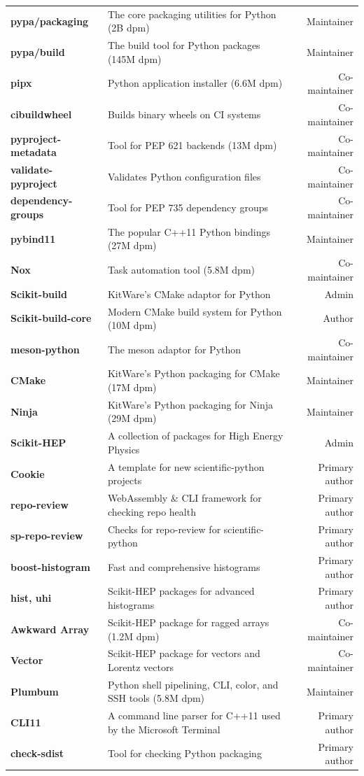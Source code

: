 \documentclass[10pt,letterpaper]{moderncv}
\begin{document}
\begin{tabularx}{\textwidth}{>{\bfseries}p{1.2in}Xr}
    pypa/packaging & The core packaging utilities for Python (2B dpm) & Maintainer \\
    pypa/build & The build tool for Python packages (145M dpm) & Maintainer \\
    pipx & Python application installer (6.6M dpm) & Co-maintainer \\
    cibuildwheel & Builds binary wheels on CI systems & Co-maintainer \\
    pyproject-metadata & Tool for PEP 621 backends (13M dpm) & Co-maintainer \\
    validate-pyproject & Validates Python configuration files & Co-maintainer \\
    dependency-groups & Tool for PEP 735 dependency groups & Co-maintainer \\
    pybind11 & The popular C++11 Python bindings (27M dpm) & Maintainer \\
    Nox & Task automation tool (5.8M dpm) & Co-maintainer \\
    Scikit-build & KitWare's CMake adaptor for Python & Admin \\
    Scikit-build-core & Modern CMake build system for Python (10M dpm) & Author \\
    meson-python & The meson adaptor for Python & Co-maintainer \\
    CMake & KitWare's Python packaging for CMake (17M dpm) & Maintainer \\
    Ninja & KitWare's Python packaging for Ninja (29M dpm) & Maintainer \\
    Scikit-HEP & A collection of packages for High Energy Physics & Admin \\
    Cookie & A template for new scientific-python projects & Primary author \\
    repo-review & WebAssembly \& CLI framework for checking repo health & Primary author \\
    sp-repo-review & Checks for repo-review for scientific-python & Primary author \\
    boost-histogram & Fast and comprehensive histograms & Primary author \\
    hist, uhi & Scikit-HEP packages for advanced histograms & Primary author \\
    Awkward Array & Scikit-HEP package for ragged arrays (1.2M dpm) & Co-maintainer \\
    Vector & Scikit-HEP package for vectors and Lorentz vectors & Co-maintainer \\
    Plumbum & Python shell pipelining, CLI, color, and SSH tools (5.8M dpm) & Maintainer \\
    CLI11 & A command line parser for C++11 used by the Microsoft Terminal & Primary author \\
    check-sdist & Tool for checking Python packaging & Primary author \\
\end{tabularx}
\end{document}
